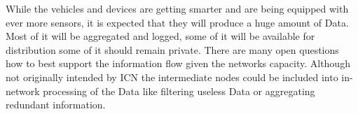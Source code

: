 \vspace{5mm} %

While the vehicles and devices are getting smarter and are being equipped with ever more sensors, it is expected that they will produce a huge amount of Data. Most of it will be aggregated and logged, some of it will be available for distribution some of it should remain private. There are many open questions how to best support the information flow given the networks capacity. Although not originally intended by ICN the intermediate nodes could be included into in-network processing of the Data like filtering useless Data or aggregating redundant information.